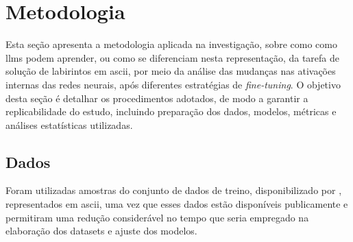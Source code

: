 
\chapter{Metodologia}\label{cap:metodologia}


Esta seção apresenta a metodologia aplicada na investigação, sobre como como \gls{llms} podem aprender, ou como se diferenciam nesta representação, da tarefa de solução de labirintos em \gls{ascii}, por meio da análise das mudanças nas ativações internas das redes neurais, após diferentes estratégias de \textit{fine-tuning}. O objetivo desta seção é detalhar os procedimentos adotados, de modo a garantir a replicabilidade do estudo, incluindo preparação dos dados, modelos, métricas e análises estatísticas utilizadas.

\section{Dados}

Foram utilizadas amostras do conjunto de dados de treino, disponibilizado por \citet{dao2025alphamaze}, representados em \gls{ascii}, uma vez que esses dados estão disponíveis publicamente e permitiram uma redução considerável no tempo que seria empregado na elaboração dos datasets e ajuste dos modelos.

